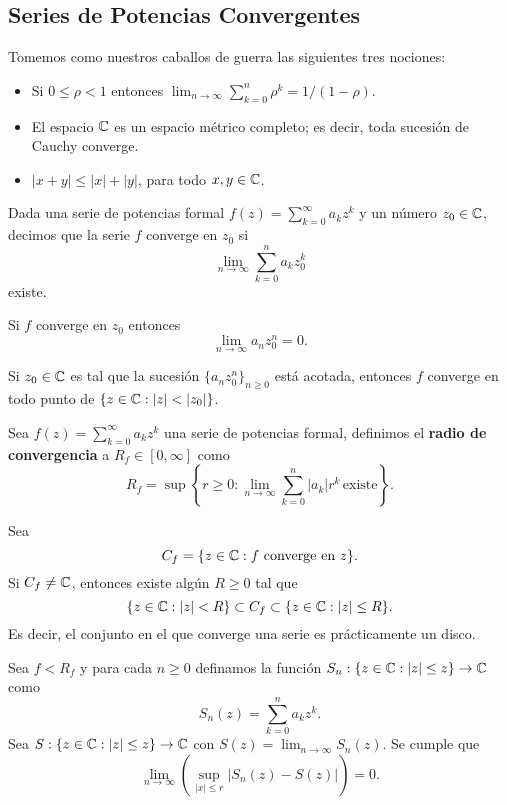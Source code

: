 \subsection{Series de Potencias Convergentes}

Tomemos como nuestros caballos de guerra las siguientes tres nociones:
\begin{itemize}
  \item Si $0 \leq \rho < 1$ entonces $\lim_{n \to \infty} \sum_{k = 0}^n \rho^k = 1 / (1 - \rho)$.
  \item El espacio $\mathbb C$ es un espacio m\'etrico completo; es decir, toda sucesi\'on de Cauchy converge.
  \item $|x + y| \leq |x| + |y|$, para todo $x, y \in \mathbb C$.
\end{itemize}

Dada una serie de potencias formal $f(z) = \sum_{k = 0}^{\infty} a_k z^k$ y un n\'umero $z_0 \in \mathbb C$,
decimos que la serie $f$ converge en $z_0$ si
\[
  \lim_{n \to \infty} \sum_{k = 0}^n a_k z_0^k
\]
existe.

\begin{theorem}
  Si $f$ converge en $z_0$ entonces
  \[
    \lim_{n \to \infty} a_n z_0^n = 0.  
  \]
\end{theorem}

\begin{theorem}
  Si $z_0 \in \mathbb C$ es tal que la sucesi\'on $\{a_n z_0^n\}_{n \geq 0}$ est\'a acotada, entonces
  $f$ converge en todo punto de $\{z \in \mathbb C : |z| < |z_0|\}$.
\end{theorem}

Sea $f(z) = \sum_{k = 0}^{\infty} a_k z^k$ una serie de potencias formal, definimos el
\textbf{radio de convergencia} a $R_f \in [0, \infty]$ como
\[
  R_f = \sup\left\{r \geq 0 : \lim_{n \to \infty}\sum_{k = 0}^n |a_k| r^k\, \text{existe}\right\}.
\]

\begin{theorem}
  Sea
  \[
    C_f = \{z \in \mathbb C : f \text{ converge en } z\}.
  \]
  Si $C_f \neq \mathbb C$, entonces existe alg\'un $R \geq 0$ tal que
  \[
    \{z \in \mathbb C : |z| < R\} \subset C_f \subset \{z \in \mathbb C : |z| \leq R\}.
  \]
  Es decir, el conjunto en el que converge una serie es pr\'acticamente un disco.
\end{theorem}

\begin{theorem}
  Sea $f < R_f$ y para cada $n \geq 0$ definamos la funci\'on
  $S_n: \{z \in \mathbb C : |z| \leq z\} \to \mathbb C$ como
  \[
    S_n(z) = \sum_{k = 0}^n a_k z^k.  
  \]
  Sea $S: \{z \in \mathbb C : |z| \leq z\} \to \mathbb C$ con $S(z) = \lim_{n \to \infty} S_n(z)$.
  Se cumple que
  \[
    \lim_{n \to \infty} \left(\sup_{|x| \leq r} |S_n(z) - S(z)|\right) = 0.
  \]
\end{theorem}

